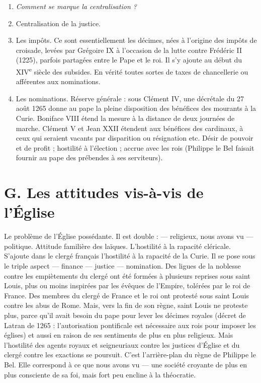 \documentclass[french,twoside]{book} %
\newlength{\listmod}
\newcommand{\listhead}[1]{\hspace{-1\listmod}\emph{#1}}
\newcommand\chapterclose{} %
\renewcommand\chapterclose{} %
\begin{document}
\begin{enumerate}[itemsep=0pt,]
\item[]\listhead{Comment se marque la centralisation ?}
\item Centralisation de la justice.
\item Les impôts. Ce sont essentiellement les décimes, nées à l’origine des impôts de croisade, levées par Grégoire IX à l’occasion de la lutte contre Frédéric II (1225), parfois partagées entre le Pape et le roi. Il s’y ajoute au début du XIV\textsuperscript{e} siècle des subsides. En vérité toutes sortes de taxes de chancellerie ou afférentes aux nominations.
\item Les nominations. Réserve générale : sous Clément IV, une décrétale du 27 août 1265 donne au pape la pleine disposition des bénéfices des mourants à la Curie. Boniface VIII étend la mesure à la distance de deux journées de marche. Clément V et Jean XXII étendent aux bénéfices des cardinaux, à ceux qui seraient vacants par disparition ou résignation etc. Désir de pouvoir et de profit ; hostilité à l’élection ; accrue avec les rois (Philippe le Bel faisait fournir au pape des prébendes à ses serviteurs).

\end{enumerate}\section[G. Les attitudes vis-à-vis de l’Église]{G. Les attitudes vis-à-vis de l’Église}
\label{c10g}
\noindent Le problème de l’Église possédante. Il est double : — religieux, nous avons vu — politique. Attitude familière des laïques. L’hostilité à la rapacité cléricale. S’ajoute dans le clergé français l’hostilité à la rapacité de la Curie. Il se pose sous le triple aspect — finance — justice — nomination. Des ligues de la noblesse contre les empiètements du clergé ont été formées à plusieurs reprises sous saint Louis, plus ou moins inspirées par les évêques de l’Empire, tolérées par le roi de France. Des membres du clergé de France et le roi ont protesté sous saint Louis contre les abus de Rome. Mais, vers la fin de son règne, saint Louis ne proteste plus, parce qu’il avait besoin du pape pour lever les décimes royales (décret de Latran de 1265 : l’autorisation pontificale est nécessaire aux rois pour imposer les églises) et aussi en raison de ses sentiments de plus en plus religieux. Mais l’hostilité des agents royaux et seigneuriaux contre les justices d’Église et du clergé contre les exactions se poursuit. C’est l’arrière-plan du règne de Philippe le Bel. Elle correspond à ce que nous avons vu — une société croyante de plus en plus consciente de sa foi, mais fort peu encline à la théocratie.
\chapterclose
\end{document}
